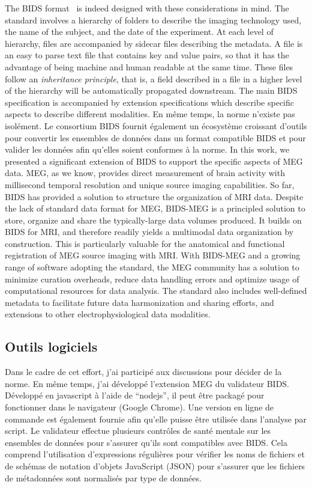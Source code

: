 The \ac{BIDS} format~\citep{gorgolewski2016brain} is indeed designed with these considerations in mind. 
The standard involves a hierarchy of folders to describe the imaging technology used, the name of the subject, and the date of the experiment. 
At each level of hierarchy, files are accompanied by sidecar  files describing the metadata. 
A  file is an easy to parse text file that contains key and value pairs, so that it has the advantage of being machine and human readable at the same time. 
These files follow an \emph{inheritance principle}, that is, a field described in a  file in a higher level of the hierarchy will be automatically propagated downstream. 
The main BIDS specification is accompanied by extension specifications which describe specific aspects to describe different modalities.
%
En même temps, la norme n'existe pas isolément. Le consortium BIDS fournit également un écosystème croissant d'outils pour convertir les ensembles de données dans un format compatible BIDS et pour valider les données afin qu'elles soient conformes à la norme.
%
In this work, we presented a significant extension of \ac{BIDS} to support the specific aspects of \ac{MEG} data. \Ac{MEG}, as we know, provides direct measurement of brain activity with millisecond temporal resolution and unique source imaging capabilities. So far, \ac{BIDS} has provided a solution to structure the organization of \ac{MRI} data. Despite the lack of standard data format for \ac{MEG}, BIDS-MEG is a principled solution to store, organize and share the typically-large data volumes produced. It builds on \ac{BIDS} for \ac{MRI}, and therefore readily yields a multimodal data organization by construction. This is particularly valuable for the anatomical and functional registration of \ac{MEG} source imaging with \ac{MRI}. With BIDS-MEG and a growing range of software adopting the standard, the \ac{MEG} community has a solution to minimize curation overheads, reduce data handling errors and optimize usage of computational resources for data analysis. The standard also includes well-defined metadata to facilitate future data harmonization and sharing efforts, and extensions to other electrophysiological data modalities.

\subsection*{Outils logiciels}
Dans le cadre de cet effort, j'ai participé aux discussions pour décider de la norme. En même temps, j'ai développé l'extension MEG du validateur BIDS. Développé en javascript à l'aide de “nodejs”, il peut être packagé pour fonctionner dans le navigateur (Google Chrome). Une version en ligne de commande est également fournie afin qu'elle puisse être utilisée dans l'analyse par script. Le validateur effectue plusieurs contrôles de santé mentale sur les ensembles de données pour s'assurer qu'ils sont compatibles avec BIDS. Cela comprend l'utilisation d'expressions régulières pour vérifier les noms de fichiers et de schémas de notation d'objets JavaScript (JSON) pour s'assurer que les fichiers de métadonnées sont normalisés par type de données.

